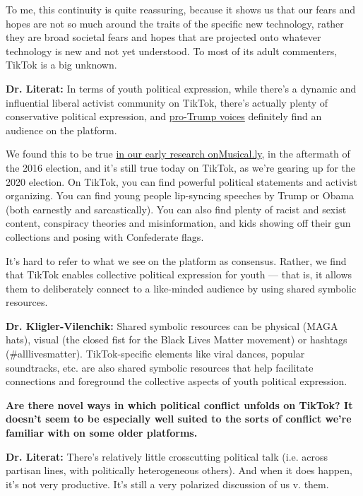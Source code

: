 To me, this continuity is quite reassuring, because it shows us that our
fears and hopes are not so much around the traits of the specific new
technology, rather they are broad societal fears and hopes that are
projected onto whatever technology is new and not yet understood. To
most of its adult commenters, TikTok is a big unknown.

\textbf{Dr. Literat:} In terms of youth political expression, while
there's a dynamic and influential liberal activist community on TikTok,
there's actually plenty of conservative political expression, and
\href{https://www.nytimes3xbfgragh.onion/2019/05/13/style/trump-tiktok.html}{pro-Trump
voices} definitely find an audience on the platform.

We found this to be true
\href{https://journals.sagepub.com/doi/10.1177/1461444819837571}{in our
early research on}\href{http://musical.ly/}{Musical.ly}, in the
aftermath of the 2016 election, and it's still true today on TikTok, as
we're gearing up for the 2020 election. On TikTok, you can find powerful
political statements and activist organizing. You can find young people
lip-syncing speeches by Trump or Obama (both earnestly and
sarcastically). You can also find plenty of racist and sexist content,
conspiracy theories and misinformation, and kids showing off their gun
collections and posing with Confederate flags.

It's hard to refer to what we see on the platform as consensus. Rather,
we find that TikTok enables collective political expression for youth
--- that is, it allows them to deliberately connect to a like-minded
audience by using shared symbolic resources.

\textbf{Dr. Kligler-Vilenchik:} Shared symbolic resources can be
physical (MAGA hats), visual (the closed fist for the Black Lives Matter
movement) or hashtags (\#alllivesmatter). TikTok-specific elements like
viral dances, popular soundtracks, etc. are also shared symbolic
resources that help facilitate connections and foreground the collective
aspects of youth political expression.

\textbf{Are there novel ways in which political conflict unfolds on
TikTok? It doesn't seem to be especially well suited to the sorts of
conflict we're familiar with on some older platforms.}

\textbf{Dr. Literat:} There's relatively little crosscutting political
talk (i.e. across partisan lines, with politically heterogeneous
others). And when it does happen, it's not very productive. It's still a
very polarized discussion of us v. them.

